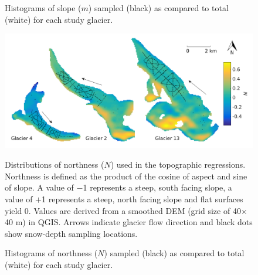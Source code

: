 \documentclass{sfuthesis}
\newcommand{\topomap}{Arrows indicate glacier flow direction and black dots show snow-depth sampling locations. }
\begin{document}
{\begin{figure}[H]
	\caption[Histograms of full and sampled slope ($m$)]{Histograms of slope ($m$) sampled (black) as compared to total (white) for each study glacier.}
	\label{sampledRange:slope}
\end{figure}

\begin{figure}[H]
	\centering
	\includegraphics[width=\textwidth]{Map_northness.png}\\
	\caption[Distributions of northness ($N$)]{Distributions of northness ($N$) used in the topographic regressions. Northness is defined as the product of the cosine of aspect and sine of slope. A value of $-$1 represents a steep, south facing slope, a value of $+$1 represents a steep, north facing slope and flat surfaces yield 0. Values are derived from a smoothed DEM (grid size of 40$\times$40 m) in QGIS. \topomap}
	\label{map:northness}
\end{figure}

\begin{figure}[H]
	\caption[Histograms of full and sampled northness ($N$)]{Histograms of northness ($N$) sampled (black) as compared to total (white) for each study glacier.}
	\label{sampledRange:northness}
\end{figure}

}
\end{document}
